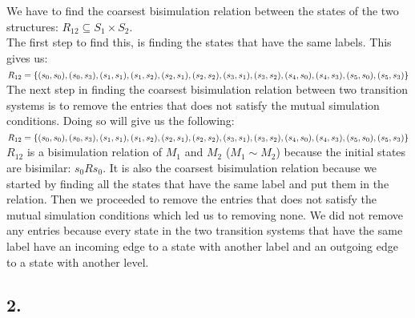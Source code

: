 \documentclass[12pt]{report}
\begin{document}
We have to find the coarsest bisimulation relation between the states of the two structures: $R_{12} \subseteq S_1 \times S_2$.\\
The first step to find this, is finding the states that have the same labels. This gives us:\\
$R_{12} = \{(s_0, s_0), (s_0, s_3), (s_1,s_1), (s_1,s_2),(s_2,s_1),(s_2,s_2),(s_3,s_1),(s_3,s_2),\\
(s_4,s_0),(s_4,s_3),(s_5,s_0),(s_5,s_3)\}$\\
The next step in finding the coarsest bisimulation relation between two transition systems is to remove the entries that does not satisfy the mutual simulation conditions. Doing so will give us the following:\\
$R_{12} = \{(s_0, s_0), (s_0, s_3), (s_1,s_1), (s_1,s_2),(s_2,s_1),(s_2,s_2),(s_3,s_1),(s_3,s_2),\\
(s_4,s_0),(s_4,s_3),(s_5,s_0),(s_5,s_3)\}$\\
$R_{12}$ is a bisimulation relation of $M_1$ and $M_2$ ($M_1 \sim M_2$) because the initial states are bisimilar: $s_0 R s_0$. It is also the coarsest bisimulation relation because we started by finding all the states that have the same label and put them in the relation. Then we proceeded to remove the entries that does not satisfy the mutual simulation conditions which led us to removing none. We did not remove any entries because every state in the two transition systems that have the same label have an incoming edge to a state with another label and an outgoing edge to a state with another level. 

\subsection*{2.}
\end{document}
